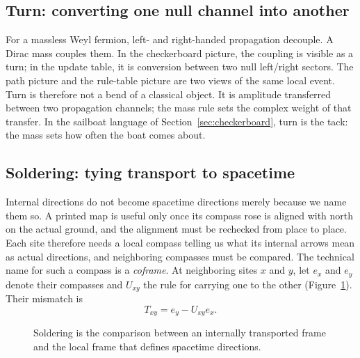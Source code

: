 \documentclass[11pt]{article}
\begin{document}
\subsection{Turn: converting one null channel into another}

For a massless Weyl fermion, left- and right-handed propagation decouple.  A
Dirac mass couples them.  In the checkerboard picture, the coupling is visible
as a turn; in the update table, it is conversion between two
null left/right sectors.  The path picture and the rule-table picture are two views of
the same local event.  Turn is therefore not a bend of a classical object.  It
is amplitude transferred between two propagation channels; the mass rule
sets the complex weight of that transfer.  In the sailboat language of
Section~\ref{sec:checkerboard}, turn is the tack: the mass sets how often the
boat comes about.

\subsection{Soldering: tying transport to spacetime}

Internal directions do not become spacetime directions merely because we name
them so.  A printed map is useful only once its compass rose is aligned with
north on the actual ground, and the alignment must be rechecked from place to
place.  Each site therefore needs a local compass telling us what its internal
arrows mean as actual directions, and neighboring compasses must be compared.
The technical name for such a compass is a \emph{coframe}.  At neighboring sites
$x$ and $y$, let $e_x$ and $e_y$ denote their compasses and $U_{xy}$ the rule
for carrying one to the other (Figure~\ref{fig:solder}).  Their mismatch is
\[
  T_{xy}=e_y-U_{xy}e_x.
\]

\begin{figure}[ht]
\centering
{}
\caption{Soldering is the comparison between an internally transported frame
and the local frame that defines spacetime directions.}
\label{fig:solder}
\end{figure}
\end{document}
